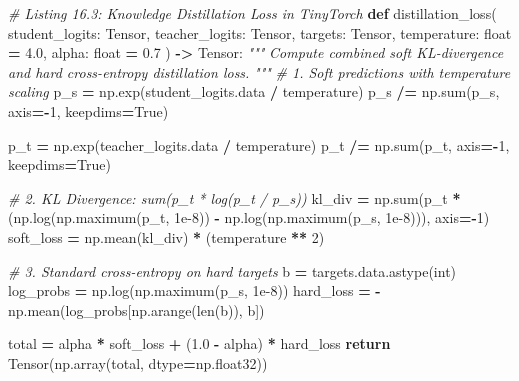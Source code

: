 \documentclass[
  letterpaper,
]{scrbook}
\newenvironment{Shaded}{\begin{snugshade}}{\end{snugshade}}
\newcommand{\BuiltInTok}[1]{#1}
\newcommand{\CommentTok}[1]{\textcolor[rgb]{0.56,0.35,0.01}{\textit{#1}}}
\newcommand{\ControlFlowTok}[1]{\textcolor[rgb]{0.13,0.29,0.53}{\textbf{#1}}}
\newcommand{\DecValTok}[1]{\textcolor[rgb]{0.00,0.00,0.81}{#1}}
\newcommand{\FloatTok}[1]{\textcolor[rgb]{0.00,0.00,0.81}{#1}}
\newcommand{\KeywordTok}[1]{\textcolor[rgb]{0.13,0.29,0.53}{\textbf{#1}}}
\newcommand{\NormalTok}[1]{#1}
\newcommand{\OperatorTok}[1]{\textcolor[rgb]{0.81,0.36,0.00}{\textbf{#1}}}
\newcommand{\VariableTok}[1]{\textcolor[rgb]{0.00,0.00,0.00}{#1}}
\begin{document}
\begin{Shaded}
\begin{Highlighting}[]
\CommentTok{\# Listing 16.3: Knowledge Distillation Loss in TinyTorch}
\KeywordTok{def}\NormalTok{ distillation\_loss(}
\NormalTok{    student\_logits: Tensor,}
\NormalTok{    teacher\_logits: Tensor,}
\NormalTok{    targets: Tensor,}
\NormalTok{    temperature: }\BuiltInTok{float} \OperatorTok{=} \FloatTok{4.0}\NormalTok{,}
\NormalTok{    alpha: }\BuiltInTok{float} \OperatorTok{=} \FloatTok{0.7}
\NormalTok{) }\OperatorTok{{-}\textgreater{}}\NormalTok{ Tensor:}
    \CommentTok{"""}
\CommentTok{    Compute combined soft KL{-}divergence and hard cross{-}entropy distillation loss.}
\CommentTok{    """}
    \CommentTok{\# 1. Soft predictions with temperature scaling}
\NormalTok{    p\_s }\OperatorTok{=}\NormalTok{ np.exp(student\_logits.data }\OperatorTok{/}\NormalTok{ temperature)}
\NormalTok{    p\_s }\OperatorTok{/=}\NormalTok{ np.}\BuiltInTok{sum}\NormalTok{(p\_s, axis}\OperatorTok{={-}}\DecValTok{1}\NormalTok{, keepdims}\OperatorTok{=}\VariableTok{True}\NormalTok{)}

\NormalTok{    p\_t }\OperatorTok{=}\NormalTok{ np.exp(teacher\_logits.data }\OperatorTok{/}\NormalTok{ temperature)}
\NormalTok{    p\_t }\OperatorTok{/=}\NormalTok{ np.}\BuiltInTok{sum}\NormalTok{(p\_t, axis}\OperatorTok{={-}}\DecValTok{1}\NormalTok{, keepdims}\OperatorTok{=}\VariableTok{True}\NormalTok{)}

    \CommentTok{\# 2. KL Divergence: sum(p\_t * log(p\_t / p\_s))}
\NormalTok{    kl\_div }\OperatorTok{=}\NormalTok{ np.}\BuiltInTok{sum}\NormalTok{(p\_t }\OperatorTok{*}\NormalTok{ (np.log(np.maximum(p\_t, }\FloatTok{1e{-}8}\NormalTok{)) }\OperatorTok{{-}}\NormalTok{ np.log(np.maximum(p\_s, }\FloatTok{1e{-}8}\NormalTok{))), axis}\OperatorTok{={-}}\DecValTok{1}\NormalTok{)}
\NormalTok{    soft\_loss }\OperatorTok{=}\NormalTok{ np.mean(kl\_div) }\OperatorTok{*}\NormalTok{ (temperature }\OperatorTok{**} \DecValTok{2}\NormalTok{)}

    \CommentTok{\# 3. Standard cross{-}entropy on hard targets}
\NormalTok{    b }\OperatorTok{=}\NormalTok{ targets.data.astype(}\BuiltInTok{int}\NormalTok{)}
\NormalTok{    log\_probs }\OperatorTok{=}\NormalTok{ np.log(np.maximum(p\_s, }\FloatTok{1e{-}8}\NormalTok{))}
\NormalTok{    hard\_loss }\OperatorTok{=} \OperatorTok{{-}}\NormalTok{np.mean(log\_probs[np.arange(}\BuiltInTok{len}\NormalTok{(b)), b])}

\NormalTok{    total }\OperatorTok{=}\NormalTok{ alpha }\OperatorTok{*}\NormalTok{ soft\_loss }\OperatorTok{+}\NormalTok{ (}\FloatTok{1.0} \OperatorTok{{-}}\NormalTok{ alpha) }\OperatorTok{*}\NormalTok{ hard\_loss}
    \ControlFlowTok{return}\NormalTok{ Tensor(np.array(total, dtype}\OperatorTok{=}\NormalTok{np.float32))}
\end{Highlighting}
\end{Shaded}
\end{document}
